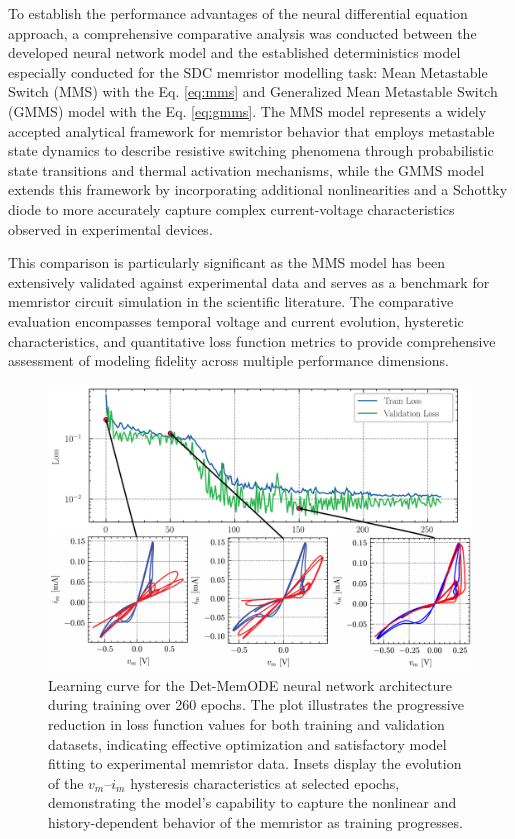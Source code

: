 \documentclass[11pt, oneside]{article}
\begin{document}
To establish the performance advantages of the neural differential equation approach, a comprehensive comparative analysis was conducted between the developed neural network model and the established deterministics model especially conducted for the SDC memristor modelling task: Mean Metastable Switch (MMS) with the Eq. \eqref{eq:mms} and Generalized Mean Metastable Switch (GMMS) model with the Eq. \eqref{eq:gmms}. The MMS model represents a widely accepted analytical framework for memristor behavior that employs metastable state dynamics to describe resistive switching phenomena through probabilistic state transitions and thermal activation mechanisms, while the GMMS model extends this framework by incorporating additional nonlinearities and a Schottky diode to more accurately capture complex current-voltage characteristics observed in experimental devices.

This comparison is particularly significant as the MMS model has been extensively validated against experimental data and serves as a benchmark for memristor circuit simulation in the scientific literature. The comparative evaluation encompasses temporal voltage and current evolution, hysteretic characteristics, and quantitative loss function metrics to provide comprehensive assessment of modeling fidelity across multiple performance dimensions.


\begin{figure}[ht]
    \centering
    \includegraphics[width=0.8\linewidth]{figs/Training_process.pdf}
    \caption{Learning curve for the Det-MemODE neural network architecture during training over 260 epochs. The plot illustrates the progressive reduction in loss function values for both training and validation datasets, indicating effective optimization and satisfactory model fitting to experimental memristor data. Insets display the evolution of the $v_m$--$i_m$ hysteresis characteristics at selected epochs, demonstrating the model's capability to capture the nonlinear and history-dependent behavior of the memristor as training progresses.}
    \label{fig:learning-curve}
\end{figure}
\end{document}
